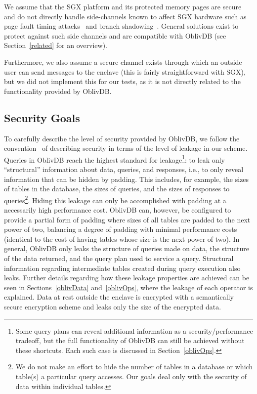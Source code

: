 \documentclass[letterpaper,twocolumn,10pt]{article}
\def\name/{OblivDB}
\begin{document}
We assume that the SGX platform and its protected memory pages are secure and do not directly handle side-channels known to affect SGX hardware such as page fault timing attacks~\cite{XCP15} and branch shadowing~\cite{LSG+16}. General solutions exist to protect against such side channels and are compatible with \name/ (see Section~\ref{related} for an overview). 

Furthermore, we also assume a secure channel exists through which an outside user can send messages to the enclave (this is fairly straightforward with SGX), but we did not implement this for our tests, as it is not directly related to the functionality provided by \name/.
 
\subsection{Security Goals}
To carefully describe the level of security provided by \name/, we follow the convention~\cite{FVY+17} of describing security in terms of the level of leakage in our scheme. Queries in \name/ reach the highest standard for leakage\footnote{Some query plans can reveal additional information as a security/performance tradeoff, but the full functionality of \name/ can still be achieved without these shortcuts. Each such case is discussed in Section~\ref{oblivOps}.}: to leak only ``structural'' information about data, queries, and responses, i.e., to only reveal information that can be hidden by padding. This includes, for example, the sizes of tables in the database, the sizes of queries, and the sizes of responses to queries\footnote{We do not make an effort to hide the number of tables in a database or which table(s) a particular query accesses. Our goals deal only with the security of data within individual tables.}. Hiding this leakage can only be accomplished with padding at a necessarily high performance cost. \name/ can, however, be configured to provide a partial form of padding where sizes of all tables are padded to the next power of two, balancing a degree of padding with minimal performance costs (identical to the cost of having tables whose size is the next power of two). In general, \name/ only leaks the structure of queries made on data, the structure of the data returned, and the query plan used to service a query. Structural information regarding intermediate tables created during query execution also leaks. Further details regarding how these leakage properties are achieved can be seen in Sections~\ref{oblivData} and~\ref{oblivOps}, where the leakage of each operator is explained. Data at rest outside the enclave is encrypted with a semantically secure encryption scheme and leaks only the size of the encrypted data. 
\end{document}
